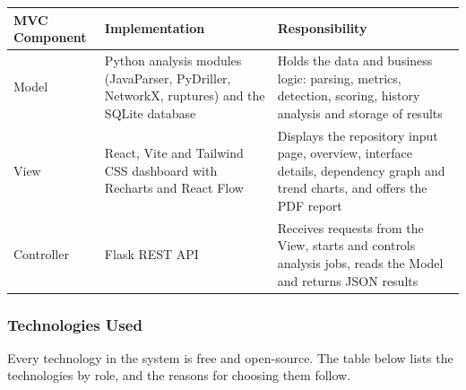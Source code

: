 \documentclass[12pt,a4paper]{article}
\begin{document}
\begin{table}[H]
\centering
\renewcommand{\arraystretch}{1.5}
\setlength{\tabcolsep}{6pt}
 
\begin{tabular}{|L{1.1in}|L{2.1in}|L{2.15in}|}
\hline
\textbf{MVC Component} & \textbf{Implementation} & \textbf{Responsibility} \\
\hline
Model & Python analysis modules (JavaParser, PyDriller, NetworkX, ruptures) and the SQLite database & Holds the data and business logic: parsing, metrics, detection, scoring, history analysis and storage of results \\
\hline
View & React, Vite and Tailwind CSS dashboard with Recharts and React Flow & Displays the repository input page, overview, interface details, dependency graph and trend charts, and offers the PDF report \\
\hline
Controller & Flask REST API & Receives requests from the View, starts and controls analysis jobs, reads the Model and returns JSON results \\
\hline
\end{tabular}
\end{table}
 
\subsubsection{Technologies Used}
 
\begin{spacing}{1.5}
\justifying
Every technology in the system is free and open-source. The table below lists
the technologies by role, and the reasons for choosing them follow.
\end{spacing}
 
\end{document}
